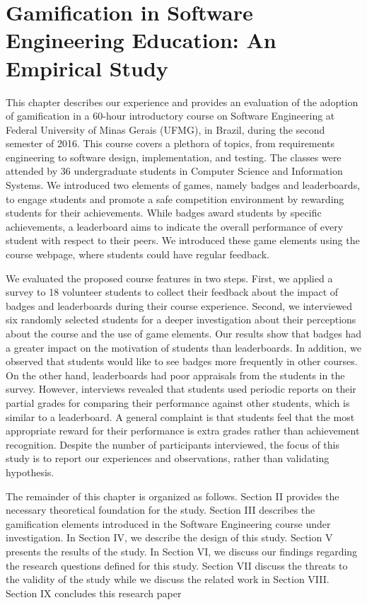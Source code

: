 \chapter{Gamification in Software Engineering Education:
An Empirical Study}
\label{ch:gamificationExperiment}

This chapter describes our experience and provides an evaluation of the adoption of gamification in a 60-hour introductory course on Software Engineering at Federal University of Minas Gerais (UFMG), in Brazil, during the second semester of 2016. This course covers a plethora of topics, from requirements engineering to software design, implementation, and testing. The classes were attended by 36 undergraduate students in Computer Science and Information Systems. We introduced two elements of games, namely badges and leaderboards, to engage students and promote a safe competition environment by rewarding students for their achievements. While badges award students by specific achievements, a leaderboard aims to indicate the overall performance of every student with respect to their peers. We introduced these game elements using the course webpage, where students could have regular feedback. 

We evaluated the proposed course features in two steps. First, we applied a survey to 18 volunteer students to collect their feedback about the impact of badges and leaderboards during their course experience. Second, we interviewed six randomly selected students for a deeper investigation about their perceptions about the course and the use of game elements. Our results show that badges had a greater impact on the motivation of students than leaderboards. In addition, we observed that students would like to see badges more frequently in other courses. On the other hand, leaderboards had poor appraisals from the students in the survey. However, interviews revealed that students used periodic reports on their partial grades for comparing their performance against other students, which is similar to a leaderboard. A general complaint is that students feel that the most appropriate reward for their performance is extra grades rather than achievement recognition. Despite the number of participants interviewed, the focus of this study is to report our experiences and observations, rather than validating hypothesis.

The remainder of this chapter is organized as follows. Section II provides the necessary theoretical foundation for the study. Section III describes the gamification elements introduced in the Software Engineering course under investigation. In Section IV, we describe the design of this study. Section V presents the results of the study. In Section VI, we discuss our findings regarding the research questions defined for this study. Section VII discuss the threats to the validity of the study while we discuss the related work in Section VIII. Section IX concludes this research paper

